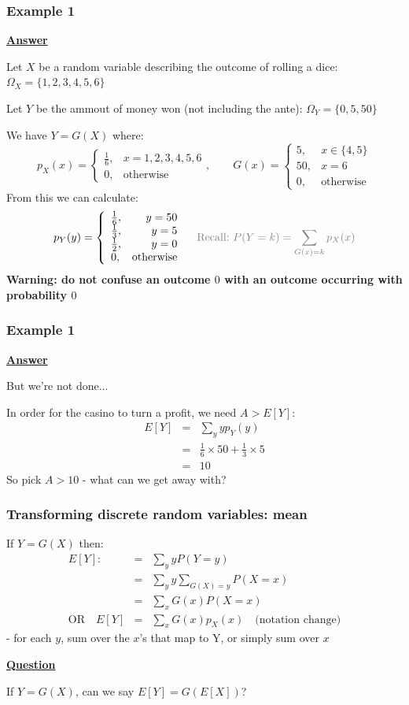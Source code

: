 \documentclass[t,8pt]{beamer}%
\begin{document}
\begin{frame}
\frametitle{Example 1}
{\bf\underline{Answer}} \par
Let $X$ be a random variable describing the outcome of rolling a dice: $\Omega_X=\{1,2,3,4,5,6\}$ \par
Let $Y$ be the ammout of money won (not including the ante): $\Omega_Y=\{0,5,50\}$ \par
We have $Y=G(X)$ where:
$$
		p_X(x) = \left\{\begin{array}{lr}
			\frac 16, & x=1,2,3,4,5,6\\
			0, & \text{otherwise}
		\end{array}\right.,\qquad
        G(x)=\left\{\begin{array}{lr}
			5, & x\in\{4,5\}\\
            50, & x=6\\
			0, & \text{otherwise}
		\end{array}\right.
$$
From this we can calculate:
$$
		p_Y(y) = \left\{\begin{array}{lr}
            \frac 16, & y=50\\
			\frac 13, & y=5\\
			\frac 12, & y=0\\
            0, & \text{otherwise}
		\end{array}\right.\quad
        \color{gray}{
        \text{Recall:}\ P(Y=k)=\sum_{G(x)=k}p_X(x)
        }
$$
{\bf Warning: do not confuse an outcome $0$ with an outcome occurring with probability $0$}
\end{frame}

\begin{frame}
\frametitle{Example 1}
{\bf\underline{Answer}} \par
But we're not done... \par
In order for the casino to turn a profit, we need $A>E[Y]$:
\begin{eqnarray*}
    E[Y]&=&\sum_yyp_Y(y)\\
    &=&\frac 16\times 50+\frac 13\times 5\\
    &=&10
\end{eqnarray*}
So pick $A>10$ - what can we get away with?
\end{frame}

\begin{frame}
    \frametitle{Transforming discrete random variables: mean}
    If $Y=G(X)$ then:
    \begin{eqnarray*}
        E[Y]:&=&\sum_yyP(Y=y)\\
        &=&\sum_yy\sum_{G(X)=y}P(X=x)\\
        &=&\sum_xG(x)P(X=x)\\
        \text{OR}\quad E[Y]&=&\sum_xG(x)p_X(x)\quad\text{(notation change)}
    \end{eqnarray*}
{\small\color{NavyBlue} - for each $y$, sum over the $x$'s that map to Y, or simply sum over $x$} \par
{\bf\underline{Question}} \par
If $Y=G(X)$, can we say $E[Y]=G(E[X])$?
\end{frame}
\end{document}
